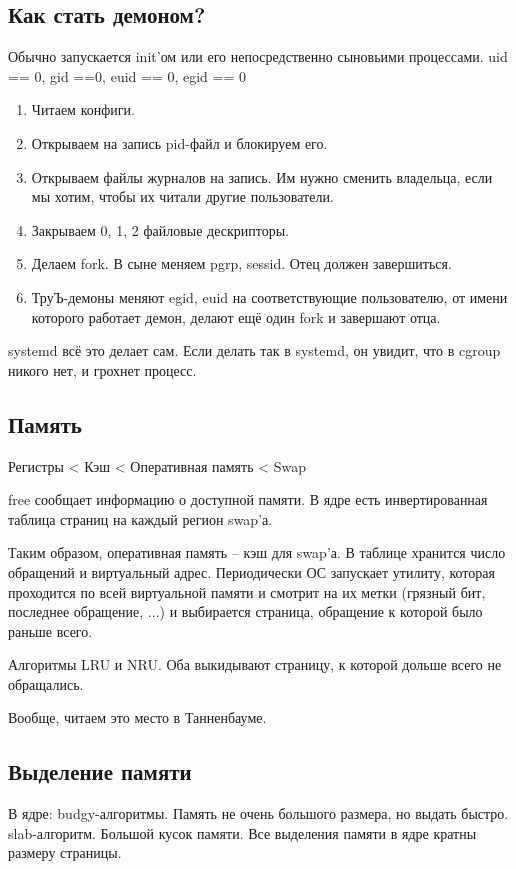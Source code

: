 \documentclass[a4paper,10pt]{article}
\begin{document}
\subsection{Как стать демоном?}
Обычно запускается init'ом или его непосредственно сыновьими процессами. 
uid == 0, gid ==0, euid == 0, egid == 0

\begin{enumerate}
 \item Читаем конфиги.
 \item Открываем на запись pid-файл и блокируем его.
 \item Открываем файлы журналов на запись. Им нужно сменить владельца, если мы хотим, чтобы их читали другие пользователи.
 \item Закрываем 0, 1, 2 файловые дескрипторы.
 \item Делаем fork. В сыне меняем pgrp, sessid. Отец должен завершиться.
 \item ТруЪ-демоны меняют egid, euid на соответствующие пользователю, от имени которого работает демон, делают ещё один fork и завершают отца.
\end{enumerate}
systemd всё это делает сам. Если делать так в systemd, он увидит, что в cgroup никого нет, и грохнет процесс.

\subsection{Память}
Регистры < Кэш < Оперативная память < Swap

free сообщает информацию о доступной памяти. В ядре есть инвертированная таблица страниц на каждый регион swap'а.

Таким образом, оперативная память -- кэш для swap'а. В таблице хранится число обращений и виртуальный адрес.
Периодически ОС запускает утилиту, которая проходится по всей виртуальной памяти и смотрит на их метки (грязный бит, последнее обращение, ...) и выбирается страница, обращение к которой было раньше всего.

Алгоритмы LRU и NRU. Оба выкидывают страницу, к которой дольше всего не обращались.

Вообще, читаем это место в Танненбауме.

\subsection{Выделение памяти}

В ядре:
budgy-алгоритмы. Память не очень большого размера, но выдать быстро.
slab-алгоритм. Большой кусок памяти.
Все выделения памяти в ядре кратны размеру страницы.
\end{document}
